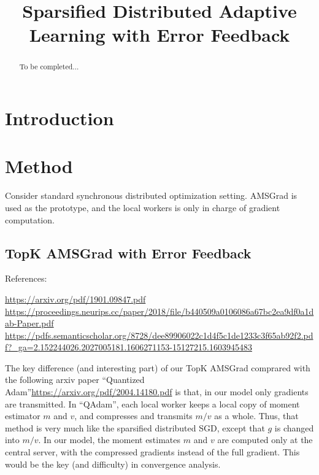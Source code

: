 \documentclass{article}
\begin{document}
\title{Sparsified Distributed Adaptive Learning with Error Feedback}


\date{}
\maketitle

\begin{abstract}
To be completed...
\end{abstract}

\section{Introduction}\label{sec:introduction}



\section{Method}\label{sec:main}

Consider standard synchronous distributed optimization setting. AMSGrad is used as the prototype, and the local workers is only in charge of gradient computation.


\subsection{TopK AMSGrad with Error Feedback}

References:

\citep{karimireddy2019error}
\citep{shi2019convergence}
\citep{stich2018sparsified}
\url{https://arxiv.org/pdf/1901.09847.pdf}
\url{https://proceedings.neurips.cc/paper/2018/file/b440509a0106086a67bc2ea9df0a1dab-Paper.pdf}
\url{https://pdfs.semanticscholar.org/8728/dee89906022c1d4f5c1de1233c3f65ab92f2.pdf?_ga=2.152244026.2027005181.1606271153-15127215.1603945483}


The key difference (and interesting part) of our TopK AMSGrad comprared with the following arxiv paper ``Quantized Adam''\url{https://arxiv.org/pdf/2004.14180.pdf} is that, in our model only gradients are transmitted. In ``QAdam'', each local worker keeps a local copy of moment estimator $m$ and $v$, and compresses and transmits $m/v$ as a whole. Thus, that method is very much like the sparsified distributed SGD, except that $g$ is changed into $m/v$. In our model, the moment estimates $m$ and $v$ are computed only at the central server, with the compressed gradients instead of the full gradient. This would be the key (and difficulty) in convergence analysis.
\end{document}
